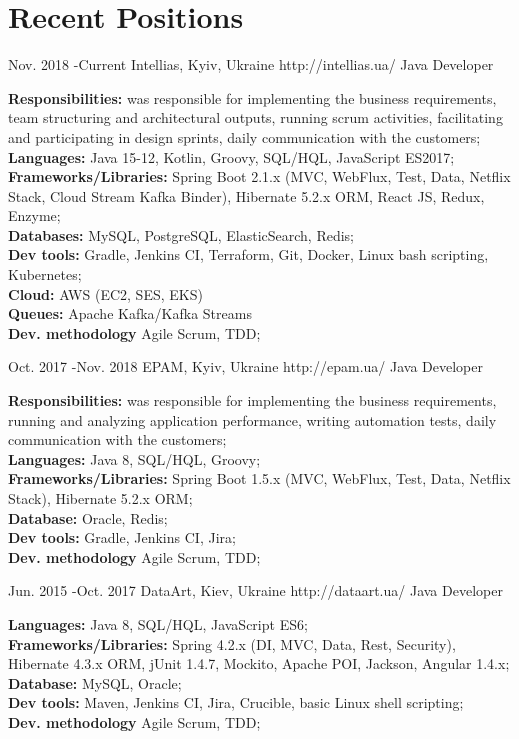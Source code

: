 \documentclass[10pt]{article} %
\begin{document}
\section{Recent Positions}
\job
{Nov. 2018 -}{Current}
{Intellias, Kyiv, Ukraine}
{http://intellias.ua/}
{Java Developer}
{\rule{0mm}{5mm}\textbf{Responsibilities:}  was responsible for implementing the business requirements, team structuring and architectural outputs, running scrum activities, facilitating and participating in design sprints, daily communication with the customers;
\\ \textbf{Languages:}  Java 15-12, Kotlin, Groovy,  SQL/HQL, JavaScript ES2017;
\\  \textbf{Frameworks/Libraries:}  Spring Boot 2.1.x (MVC, WebFlux, Test, Data, Netflix Stack, Cloud Stream Kafka Binder), Hibernate 5.2.x ORM, React JS, Redux, Enzyme;
\\ \textbf{Databases:}  MySQL, PostgreSQL, ElasticSearch, Redis;
\\  \textbf{Dev tools:} Gradle, Jenkins CI, Terraform, Git, Docker, Linux bash scripting, Kubernetes;
\\ \textbf{Cloud:} AWS (EC2, SES, EKS)
\\ \textbf{Queues:} Apache Kafka/Kafka Streams
\\  \textbf{Dev. methodology} Agile Scrum, TDD;
 }
 
\job
{Oct. 2017 -}{Nov. 2018}
{EPAM, Kyiv, Ukraine}
{http://epam.ua/}
{Java Developer}
{
\rule{0mm}{5mm}\textbf{Responsibilities:}  was responsible for implementing the business requirements, running and analyzing application performance, writing automation tests, daily communication with the customers;
\\ \textbf{Languages:}  Java 8, SQL/HQL, Groovy;
\\  \textbf{Frameworks/Libraries:}  Spring Boot 1.5.x (MVC, WebFlux, Test, Data, Netflix Stack), Hibernate 5.2.x ORM;
\\ \textbf{Database:}  Oracle, Redis;
\\  \textbf{Dev tools:} Gradle, Jenkins CI, Jira;
\\  \textbf{Dev. methodology} Agile Scrum, TDD;
 }

\job
{Jun. 2015 -}{Oct. 2017}
{DataArt, Kiev, Ukraine}
{http://dataart.ua/}
{Java Developer}
{

\rule{0mm}{5mm}\textbf{Languages:}  Java 8, SQL/HQL, JavaScript ES6;
\\  \textbf{Frameworks/Libraries:}  Spring 4.2.x (DI, MVC, Data, Rest, Security), Hibernate 4.3.x ORM, jUnit 1.4.7, Mockito, Apache POI, Jackson, Angular 1.4.x;
\\ \textbf{Database:}  MySQL, Oracle;
\\  \textbf{Dev tools:} Maven, Jenkins CI, Jira, Crucible, basic Linux shell scripting;
\\  \textbf{Dev. methodology} Agile Scrum, TDD;
 }
\end{document}
